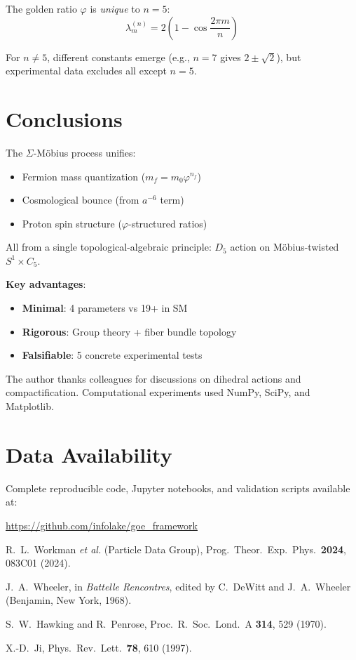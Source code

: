 \documentclass[twocolumn,preprintnumbers,amsmath,amssymb,superscriptaddress]{revtex4-2}
\newcommand{\Dfive}{D_5}
\newcommand{\Cfive}{C_5}
\newcommand{\varphig}{\varphi}
\begin{document}
The golden ratio $\varphig$ is \textit{unique} to $n=5$:
\begin{equation}
\lambda_m^{(n)} = 2\left(1 - \cos\frac{2\pi m}{n}\right)
\end{equation}

For $n \neq 5$, different constants emerge (e.g., $n=7$ gives $2 \pm \sqrt{2}$), but experimental data excludes all except $n=5$.

\section{Conclusions}

The $\Sigma$-M\"obius process unifies:
\begin{itemize}
\item Fermion mass quantization ($m_f = m_0 \varphig^{n_f}$)
\item Cosmological bounce (from $a^{-6}$ term)
\item Proton spin structure ($\varphig$-structured ratios)
\end{itemize}

All from a single topological-algebraic principle: $\Dfive$ action on M\"obius-twisted $S^1 \times \Cfive$.

\textbf{Key advantages}:
\begin{itemize}
\item \textbf{Minimal}: 4 parameters vs 19+ in SM
\item \textbf{Rigorous}: Group theory + fiber bundle topology
\item \textbf{Falsifiable}: 5 concrete experimental tests
\end{itemize}

\begin{acknowledgments}
The author thanks colleagues for discussions on dihedral actions and compactification. Computational experiments used NumPy, SciPy, and Matplotlib.
\end{acknowledgments}

\section*{Data Availability}
Complete reproducible code, Jupyter notebooks, and validation scripts available at:
\begin{center}
\url{https://github.com/infolake/goe_framework}
\end{center}

\begin{thebibliography}{99}

 R.\ L.\ Workman \textit{et al.} (Particle Data Group), Prog.\ Theor.\ Exp.\ Phys.\ \textbf{2024}, 083C01 (2024).

 J.\ A.\ Wheeler, in \textit{Battelle Rencontres}, edited by C.\ DeWitt and J.\ A.\ Wheeler (Benjamin, New York, 1968).

 S.\ W.\ Hawking and R.\ Penrose, Proc.\ R.\ Soc.\ Lond.\ A \textbf{314}, 529 (1970).

 X.-D.\ Ji, Phys.\ Rev.\ Lett.\ \textbf{78}, 610 (1997).

\end{thebibliography}
\end{document}
